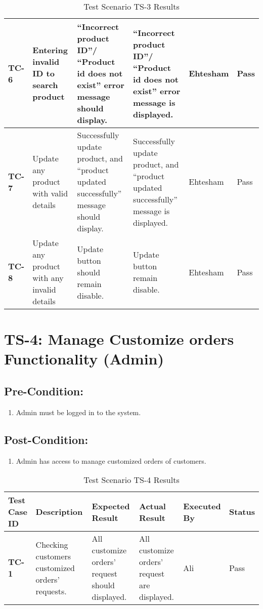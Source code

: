 \begin{table}[H]
\begin{tabular}{ | m{1cm} | m{2.3cm}| m{3.3cm} | m{3.3cm} | m{1.7cm} | m{1.3cm} |}
  \\  \hline
  \textbf{TC-6} & Entering invalid ID to search product & “Incorrect product ID”/ “Product id does not exist” error message should display. & “Incorrect product ID”/ “Product id does not exist” error message is displayed. & Ehtesham & Pass
  \\  \hline
  \textbf{TC-7} & Update any product with valid details & Successfully update product, and “product updated successfully” message should display. & Successfully update product, and “product updated successfully” message is displayed. & Ehtesham & Pass
  \\  \hline
  \textbf{TC-8} & Update any product with any invalid details & Update button should remain disable. & Update button remain disable. & Ehtesham & Pass
  \\  \hline
  
\end{tabular}
    \caption{Test Scenario TS-3 Results}
    \label{tab: Test Scenario TS-3 Results}
\end{table}

\section{TS-4: Manage Customize orders Functionality (Admin)}
\subsection{Pre-Condition:}
\begin{enumerate}
  \item Admin must be logged in to the system.
\end{enumerate}
\subsection{Post-Condition:}
\begin{enumerate}
  \item Admin has access to manage customized orders of customers.
\end{enumerate}

\begin{table}[H]
    \centering
   \begin{tabular}{ | m{1cm} | m{2.5cm}| m{2.7cm} | m{2.7cm} | m{1.7cm} | m{1.3cm} |}  
  \hline  \textbf{Test Case ID} &  \textbf{Description} &  \textbf{Expected Result} &  \textbf{Actual Result} &  \textbf{Executed By} &  \textbf{Status}  \\  \hline
  \textbf{TC-1} & Checking customers customized orders’ requests. & All customize orders’ request should displayed. & All customize orders’ request are displayed. & Ali & Pass
  \\  \hline
  
\end{tabular}
    \caption{Test Scenario TS-4 Results}
    \label{tab: Test Scenario TS-4 Results}
\end{table}


